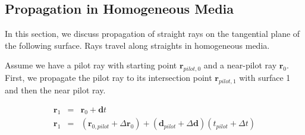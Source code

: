 \documentclass[12pt,a4paper,twoside,openright,BCOR10mm,headsepline,titlepage,abstracton,chapterprefix,final]{scrreprt}
\newcommand\Vector[1]{{\mathbf{#1}}}
\begin{document}
\subsection{Propagation in Homogeneous Media}
In this section, we discuss propagation of straight rays on the tangential plane of the following surface.
Rays travel along straights in homogeneous media.

Assume we have a pilot ray with starting point $\Vector{r}_{pilot,0}$ and a near-pilot ray ${\Vector{r}_0}$.
First, we propagate the pilot ray to its intersection point $\Vector{r}_{pilot,1}$ with surface 1 and then the near pilot ray.

\begin{eqnarray}
 \Vector{r}_1 &=& \Vector{r}_0 + \Vector{d} t \\
 \Vector{r}_1 &=& (\Vector{r}_{0,pilot} + \Delta\Vector{r}_0) + (\Vector{d}_{pilot} + \Delta\Vector{d}) (t_{pilot} + \Delta t) \\ 
\end{eqnarray} 
\end{document}

